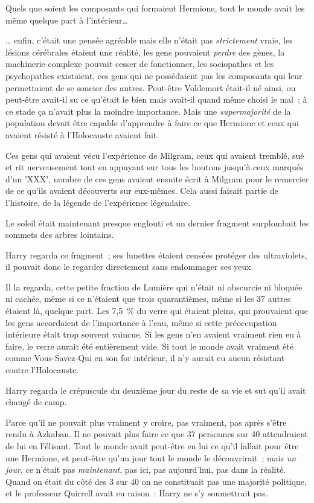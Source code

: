 Quels que soient les composants qui formaient Hermione, tout le monde avait les même quelque part à l'intérieur…

… enfin, c'était une pensée agréable mais elle n'était pas \emph{strictement} vraie, les lésions cérébrales étaient une réalité, les gens pouvaient \emph{perdre} des gènes, la machinerie complexe pouvait cesser de fonctionner, les sociopathes et les psychopathes existaient, ces gens qui ne possédaient pas les composants qui leur permettaient de se soucier des autres. Peut-être Voldemort était-il né ainsi, ou peut-être avait-il su ce qu'était le bien mais avait-il quand même choisi le mal~; à ce stade ça n'avait plus la moindre importance. Mais une \emph{supermajorité} de la population devait être capable d'apprendre à faire ce que Hermione et ceux qui avaient résisté à l'Holocauste avaient fait.

Ces gens qui avaient vécu l'expérience de Milgram, ceux qui avaient tremblé, sué et rit nerveusement tout en appuyant sur tous les boutons jusqu'à ceux marqués d'un 'XXX', nombre de ces gens avaient ensuite écrit à Milgram pour le remercier de ce qu'ils avaient découverts sur eux-mêmes. Cela aussi faisait partie de l'histoire, de la légende de l'expérience légendaire.

Le soleil était maintenant presque englouti et un dernier fragment surplombait les sommets des arbres lointains.

Harry regarda ce fragment~; ses lunettes étaient censées protéger des ultraviolets, il pouvait donc le regarder directement sans endommager ses yeux.

Il la regarda, cette petite fraction de Lumière qui n'était ni obscurcie ni bloquée ni cachée, même si ce n'étaient que trois quarantièmes, même si les 37 autres étaient là, quelque part. Les 7,5~\% du verre qui étaient pleins, qui prouvaient que les gens accordaient de l'importance à l'eau, même si cette préoccupation intérieure était trop souvent vaincue. Si les gens n'en avaient vraiment rien eu à faire, le verre aurait été entièrement vide. Si tout le monde avait vraiment été comme Vous-Savez-Qui en son for intérieur, il n'y aurait eu aucun résistant contre l'Holocauste.

Harry regarda le crépuscule du deuxième jour du reste de sa vie et sut qu'il avait changé de camp.

Parce qu'il ne pouvait plus vraiment y croire, pas vraiment, pas après s'être rendu à Azkaban. Il ne pouvait plus faire ce que 37 personnes sur 40 attendraient de lui en l'élisant. Tout le monde avait peut-être en lui ce qu'il fallait pour être une Hermione, et peut-être qu'un jour tout le monde le découvrirait~; mais \emph{un jour}, ce n'était pas \emph{maintenant}, pas ici, pas aujourd'hui, pas dans la réalité. Quand on était du côté des 3 sur 40 on ne constituait pas une majorité politique, et le professeur Quirrell avait eu raison~: Harry ne s'y soumettrait pas.

